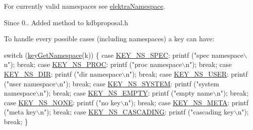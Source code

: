 For currently valid namespaces see \hyperlink{group__proposal_gaec3b8d6f430ae49b91bafe8a86310a68}{elektra\-Namespace}. 

\begin{DoxySince}{Since}
0.. Added method to kdbproposal.\-h
\end{DoxySince}
To handle every possible cases (including namespaces) a key can have\-: 
\begin{DoxyCodeInclude}
\textcolor{keywordflow}{switch} (\hyperlink{group__api_gafc3ca03ed10f87eb59bdc02cf2a0de8d}{keyGetNamespace}(k))
\{
\textcolor{keywordflow}{case} \hyperlink{group__proposal_ggaec3b8d6f430ae49b91bafe8a86310a68a2be047b124b1ca0e92b5ef124169f0d2}{KEY\_NS\_SPEC}:
        printf (\textcolor{stringliteral}{"spec namespace\(\backslash\)n"});
        \textcolor{keywordflow}{break};
\textcolor{keywordflow}{case} \hyperlink{group__proposal_ggaec3b8d6f430ae49b91bafe8a86310a68a470ecc9254fcdfccf9923a3e526c9c11}{KEY\_NS\_PROC}:
        printf (\textcolor{stringliteral}{"proc namespace\(\backslash\)n"});
        \textcolor{keywordflow}{break};
\textcolor{keywordflow}{case} \hyperlink{group__proposal_ggaec3b8d6f430ae49b91bafe8a86310a68aa0006cf27dbb2586bafba6ff1ae4f4ec}{KEY\_NS\_DIR}:
        printf (\textcolor{stringliteral}{"dir namespace\(\backslash\)n"});
        \textcolor{keywordflow}{break};
\textcolor{keywordflow}{case} \hyperlink{group__proposal_ggaec3b8d6f430ae49b91bafe8a86310a68a8ce23c70010e8ac8bb540b0947e03a4e}{KEY\_NS\_USER}:
        printf (\textcolor{stringliteral}{"user namespace\(\backslash\)n"});
        \textcolor{keywordflow}{break};
\textcolor{keywordflow}{case} \hyperlink{group__proposal_ggaec3b8d6f430ae49b91bafe8a86310a68a61adca2f9dff47e65dfcdb492ffa7a20}{KEY\_NS\_SYSTEM}:
        printf (\textcolor{stringliteral}{"system namespace\(\backslash\)n"});
        \textcolor{keywordflow}{break};
\textcolor{keywordflow}{case} \hyperlink{group__proposal_ggaec3b8d6f430ae49b91bafe8a86310a68a33d6c53529b4e6921d0b1d6565df2f1f}{KEY\_NS\_EMPTY}:
        printf (\textcolor{stringliteral}{"empty name\(\backslash\)n"});
        \textcolor{keywordflow}{break};
\textcolor{keywordflow}{case} \hyperlink{group__proposal_ggaec3b8d6f430ae49b91bafe8a86310a68a3659698b0a07454ca8055ab693e8efd1}{KEY\_NS\_NONE}:
        printf (\textcolor{stringliteral}{"no key\(\backslash\)n"});
        \textcolor{keywordflow}{break};
\textcolor{keywordflow}{case} \hyperlink{group__proposal_ggaec3b8d6f430ae49b91bafe8a86310a68ac5fbf2c3a7ae79fa2d60c48ae3e72688}{KEY\_NS\_META}:
        printf (\textcolor{stringliteral}{"meta key\(\backslash\)n"});
        \textcolor{keywordflow}{break};
\textcolor{keywordflow}{case} \hyperlink{group__proposal_ggaec3b8d6f430ae49b91bafe8a86310a68a2c9133e3095dccbcde5ca3bb13987b5d}{KEY\_NS\_CASCADING}:
        printf (\textcolor{stringliteral}{"cascading key\(\backslash\)n"});
        \textcolor{keywordflow}{break};
\}
\end{DoxyCodeInclude}
